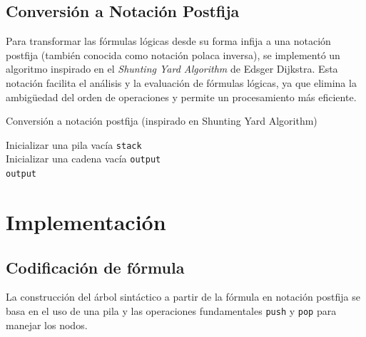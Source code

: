 \documentclass{report}
\begin{document}
	\subsection{Conversión a Notación Postfija}
	Para transformar las fórmulas lógicas desde su forma infija a una notación postfija (también conocida como notación polaca inversa), se implementó un algoritmo inspirado en el \textit{Shunting Yard Algorithm} de Edsger Dijkstra. Esta notación facilita el análisis y la evaluación de fórmulas lógicas, ya que elimina la ambigüedad del orden de operaciones y permite un procesamiento más eficiente.
	\newpage
	\begin{algorithm}[hbt!]
		\caption{Conversión a notación postfija (inspirado en Shunting Yard Algorithm)}
		Inicializar una pila vacía \texttt{stack} \\
		Inicializar una cadena vacía \texttt{output} \\
		\KwRet{} \texttt{output}
	\end{algorithm}
	\newpage
	\section{Implementaci\'on}
	\subsection{Codificaci\'on de f\'ormula}

	La construcci\'on del \'arbol sint\'actico a partir de la f\'ormula en notaci\'on postfija se basa en el uso de una pila y las operaciones fundamentales \texttt{push} y \texttt{pop} para manejar los nodos.
\end{document}
